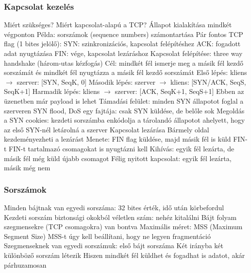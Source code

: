 \documentclass[12pt,a4paper]{article}
\begin{document}
\pagebreak

\subsubsection{Kapcsolat kezelés}

\begin{outline}
	\1 Miért szükséges? Miért kapcsolat-alapú a TCP?
		\2 Állapot kialakítása mindkét végponton
		\2 Példa: sorszámok (sequence numbers) számontartása
	\1 Pár fontos TCP flag (1 bites jelölő):
		\2 SYN: szinkronizációs, kapcsolat felépítéshez
		\2 ACK: fogadott adat nyugtázása
		\2 FIN: vége, kapcsolat lezáráshoz
	\1 Kapcsolat felépítése: three way handshake (három-utas kézfogás)
		\2 Cél: mindkét fél ismerje meg a másik fél kezdő sorszámát és mindkét fél nyugtázza a másik fél kezdő sorszámát
		\2 Első lépés: kliens $\to$ szerver: [SYN, SeqK, 0]
		\2 Második lépés: szerver $\to$ kliens: [SYN/ACK, SeqS, SeqK+1]
		\2 Harmadik lépés: kliens $\to$ szerver: [ACK, SeqK+1, SeqS+1]
			\3 Ebben az üzenetben már payload is lehet
		\2 Támadási felület: minden SYN állapotot foglal a szerveren
			\3 SYN flood, DoS egy fajtája: csak SYN küldése, de belőle sok
			\3 Megoldás a SYN cookies: kezdeti sorszámba enkódolja a tárolandó állapotot ahelyett, hogy az első SYN-nél letárolná a szerver
	\1 Kapcsolat lezárása
		\2 Bármely oldal kezdeményezheti a lezárást
		\2 Menete: FIN flag küldése, majd másik fél is küld FIN-t
			\3 FIN-t tartalmazó csomagokat is nyugtázni kell
		\2 Kihívás: egyik fél lezárta, de másik fél még küld újabb csomagot
		\2 Félig nyitott kapcsolat: egyik fél lezárta, másik még nem
\end{outline}

\pagebreak

\subsubsection{Sorszámok}

\begin{outline}
	\1 Minden bájtnak van egyedi sorszáma: 32 bites érték, idő után körbefordul
		\2 Kezdeti sorszám biztonsági okokból véletlen szám: nehéz kitalálni
	\1 Bájt folyam szegmensekre (TCP csomagokra) van bontva
		\2 Maximális méret: MSS (Maximum Segment Size)
		\2 MSS-t úgy kell beállítani, hogy ne legyen fragmentáció
		\2 Szegmenseknek van egyedi sorszámuk: első bájt sorszáma
	\1 Két irányba két különböző sorszám létezik
		\2 Hiszen mindkét fél küldhet és fogadhat is adatot, akár párhuzamosan
\end{outline}
\end{document}
